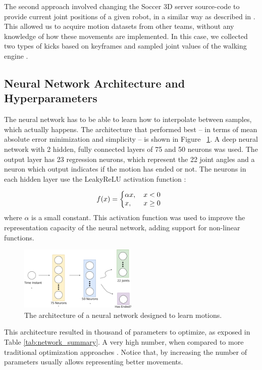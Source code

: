 The second approach involved changing the Soccer 3D server source-code to provide current joint positions of a given robot, in a similar way as described in \cite{macalpine2013}. This allowed us to acquire motion datasets from other teams, without any knowledge of how these movements are implemented. In this case, we collected two types of kicks based on keyframes and sampled joint values of the walking engine \cite{AAAI12-MacAlpine}.


\subsection{Neural Network Architecture and Hyperparameters}

The neural network has to be able to learn how to interpolate between samples, which actually happens. The architecture that performed best -- in terms of mean absolute error minimization and simplicity -- is shown in Figure ~\ref{fig:model_plot}. A deep neural network with 2 hidden, fully connected layers of 75 and 50 neurons was used. The output layer has 23 regression neurons, which represent the 22 joint angles and a neuron which output indicates if the motion has ended or not. The neurons in each hidden layer use the LeakyReLU activation function \cite{leakyrelu}: 

\[
  f(x) = \left\{
     \begin{array}{@{}l@{\thinspace}l}
       \alpha x,   & \quad x < 0  \\
       x, & \quad x \ge0 \\
     \end{array}
   \right.
\]
where $\alpha$ is a small constant. This activation function was used to improve the representation capacity of the neural network, adding support for non-linear functions.

\begin{figure}[!htbp]
\centering
\includegraphics[width=0.5\textwidth]{Cap5/architecture}
\caption{The architecture of a neural network designed to learn motions.}
\label{fig:model_plot}
\end{figure}

This architecture resulted in thousand of parameters to optimize, as exposed in Table \ref{tab:network_summary}. A very high number, when compared to more traditional optimization approaches \cite{AAAI12-MacAlpine}. Notice that, by increasing the number of parameters usually allows representing better movements.


